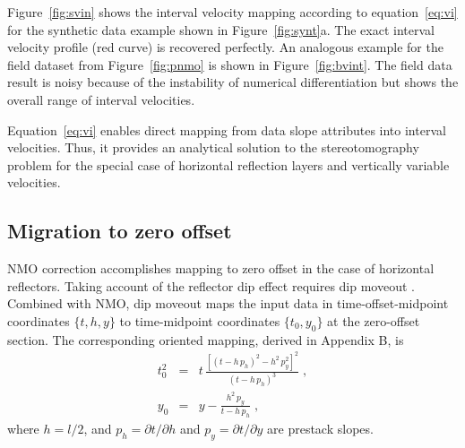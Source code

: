 Figure~\ref{fig:svin} shows the interval velocity mapping according to
equation~\ref{eq:vi} for the synthetic data example shown in
Figure~\ref{fig:synt}a. The exact interval velocity profile (red
curve) is recovered perfectly. An analogous example for the field
dataset from Figure~\ref{fig:pnmo} is shown in
Figure~\ref{fig:bvint}. The field data result is noisy because of the
instability of numerical differentiation but  
shows  the overall range of interval velocities.

Equation~\ref{eq:vi} enables direct mapping from data slope attributes
into interval velocities. Thus, it provides an analytical solution to
the stereotomography problem \cite[]{billette}
for the special case of
horizontal reflection layers and vertically variable velocities.





\subsection{Migration to zero offset}

NMO correction accomplishes mapping to zero offset in the case of
horizontal reflectors. Taking account of the reflector dip effect
requires dip moveout \cite[]{dmo}. Combined with NMO, dip moveout maps
the input data in time-offset-midpoint coordinates $\{t,h,y\}$ to
time-midpoint coordinates $\{t_0,y_0\}$ at the zero-offset
section. The corresponding oriented mapping, derived in Appendix B, is
\begin{eqnarray}
  \label{eq:tzo}
  t_0^2 & = & t\,\frac{\left[(t- h\,p_h)^2 - h^2\,p_y^2\right]^2}
  {(t-h\,p_h)^3}\;, \\
  \label{eq:yzo}
  y_0 & = & y - \frac{h^2\,p_y}{t - h\,p_h}\;,
\end{eqnarray}
where $h = l/2$, and $p_h=\partial t/\partial h$ and $p_y=\partial
t/\partial y$ are prestack slopes.



